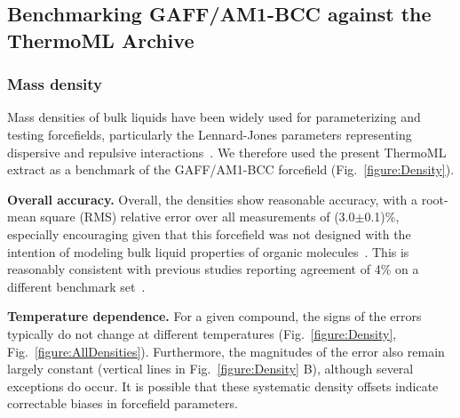 \documentclass[journal=jacsat,manuscript=article]{achemso}
\begin{document}

\subsection{Benchmarking GAFF/AM1-BCC against the ThermoML Archive}

\subsubsection{Mass density}

Mass densities of bulk liquids have been widely used for parameterizing and testing forcefields, particularly the Lennard-Jones parameters representing dispersive and repulsive interactions~\cite{jorgensen1983comparison, jorgensen1984optimized}.
We therefore used the present ThermoML extract as a benchmark of the GAFF/AM1-BCC forcefield (Fig.~\ref{figure:Density}).  

{\bf Overall accuracy.}
Overall, the densities show reasonable accuracy, with a root-mean square (RMS) relative error over all measurements of (3.0$\pm$0.1)\%, especially encouraging given that this forcefield was not designed with the intention of modeling bulk liquid properties of organic molecules~\cite{gaff,gaff2}.
This is reasonably consistent with previous studies reporting agreement of 4\% on a different benchmark set~\cite{caleman2011force}.

{\bf Temperature dependence.}
For a given compound, the signs of the errors typically do not change at different temperatures (Fig.~\ref{figure:Density}, Fig.~\ref{figure:AllDensities}).  
Furthermore, the magnitudes of the error also remain largely constant (vertical lines in Fig.~\ref{figure:Density} B), although several exceptions do occur.  
It is possible that these systematic density offsets indicate correctable biases in forcefield parameters.  
\end{document}
